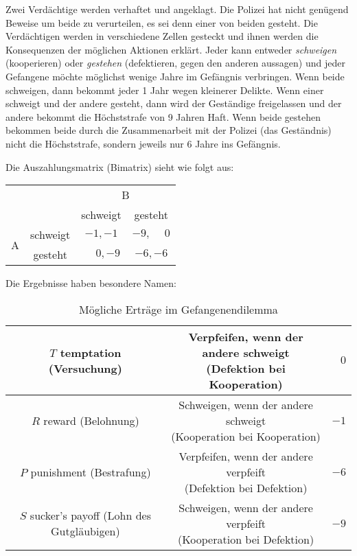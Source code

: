 Zwei Verdächtige werden verhaftet und angeklagt.
Die Polizei hat nicht genügend Beweise um beide zu verurteilen, es sei denn
einer von beiden gesteht.
Die Verdächtigen werden in verschiedene Zellen gesteckt und ihnen werden die
Konsequenzen der möglichen Aktionen erklärt.
Jeder kann entweder \emph{schweigen} (kooperieren) oder \emph{gestehen}
(defektieren, gegen den anderen aussagen) und jeder Gefangene möchte möglichst
wenige Jahre im Gefängnis verbringen.
Wenn beide schweigen, dann bekommt jeder 1 Jahr wegen kleinerer Delikte.
Wenn einer schweigt und der andere gesteht, dann wird der Geständige
freigelassen und der andere bekommt die Höchststrafe von 9 Jahren Haft.
Wenn beide gestehen bekommen beide durch die Zusammenarbeit mit der Polizei (das
Geständnis) nicht die Höchststrafe, sondern jeweils nur 6 Jahre ins Gefängnis.

Die Auszahlungsmatrix (Bimatrix) sieht wie folgt aus:
\begin{center}
  \begin{tabular}{cccc}
    & & \multicolumn{2}{c}{B}\\
    & & schweigt & gesteht\\
    \multirow{2}{*}{A} &
    schweigt & $-1, -1$ & $-9, \phantom{-}0$\\
    & gesteht & $\phantom{-}0, -9$ & $-6, -6$\\
  \end{tabular}
\end{center}

Die Ergebnisse haben besondere Namen:

\begin{table}[h]
  \centering
  \caption{Mögliche Erträge im Gefangenendilemma}
  \label{tab:moegliche_ertraege_im_gefangenendilemma}
  \begin{tabular}{ccr}
    \toprule
    \makecell{$T$\\ temptation\\ (Versuchung)} &
    \makecell{Verpfeifen, wenn der andere schweigt\\[1ex] (Defektion bei Kooperation)} &
    $0$\\
    \midrule
    \makecell{$R$\\ reward\\ (Belohnung)} &
    \makecell{Schweigen, wenn der andere schweigt\\[1ex] (Kooperation bei Kooperation)} &
    $-1$\\
    \midrule
    \makecell{$P$\\ punishment\\ (Bestrafung)} &
    \makecell{Verpfeifen, wenn der andere verpfeift\\[1ex] (Defektion bei Defektion)} &
    $-6$\\
    \midrule
    \makecell{$S$\\ sucker’s payoff\\ (Lohn des Gutgläubigen)} &
    \makecell{Schweigen, wenn der andere verpfeift\\[1ex] (Kooperation bei Defektion)} &
    $-9$\\
    \bottomrule
  \end{tabular}
\end{table}

